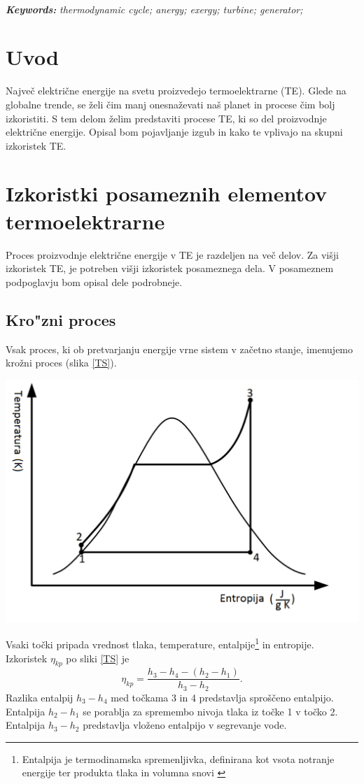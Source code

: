 \documentclass[a4paper,10pt]{article}
\begin{document}
\\
\noindent	
\textbf{\textit{Keywords:}} {\it thermodynamic cycle; anergy; exergy; turbine; generator;}
\\
\begin{multicols}{2}
\section{Uvod}
Največ električne energije na svetu proizvedejo termoelektrarne (TE). Glede na globalne trende, se želi čim manj onesnaževati naš planet in procese čim bolj izkoristiti. S tem delom želim predstaviti procese TE, ki so del proizvodnje električne energije. Opisal bom pojavljanje izgub in kako te vplivajo na skupni izkoristek TE.
\section{Izkoristki posameznih elementov termoelektrarne}
Proces proizvodnje električne energije v TE je razdeljen na več delov. Za višji izkoristek TE, je potreben višji izkoristek posameznega dela. V posameznem podpoglavju bom opisal dele podrobneje.
\subsection{Kro"zni proces}
Vsak proces, ki ob pretvarjanju energije vrne sistem v začetno stanje, imenujemo krožni proces (slika \ref{TS}).
\begin{minipage}[H!]{\linewidth}
	\includegraphics[width=0.85\columnwidth]{Untitled.png}
	\label{TS}
\end{minipage}
 Vsaki točki pripada vrednost tlaka, temperature, entalpije\footnote{Entalpija je termodinamska spremenljivka, definirana kot vsota notranje energije ter produkta tlaka in volumna snovi \citep{Wiki}} in entropije. Izkoristek $\eta_{kp}$ po sliki \ref{TS} je
\begin{equation}
	\eta_{kp}=\frac{h_3-h_4-(h_2-h_1 )}{h_3-h_2 }.
\end{equation}
Razlika entalpij $h_3-h_4$ med točkama 3 in 4 predstavlja sproščeno entalpijo. Entalpija $h_2-h_1$ se porablja za spremembo nivoja tlaka iz točke 1 v točko 2. Entalpija $h_3-h_2$ predstavlja vloženo entalpijo v segrevanje vode.

\end{multicols}
\end{document}
